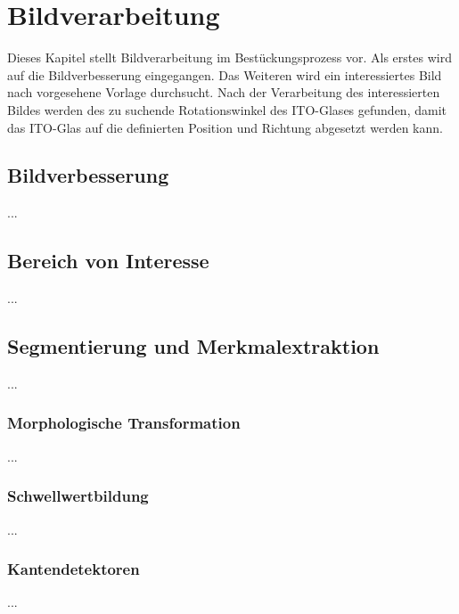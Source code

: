 \chapter{Bildverarbeitung}
Dieses Kapitel stellt Bildverarbeitung im Bestückungsprozess vor. Als erstes wird auf die Bildverbesserung eingegangen. Das Weiteren wird ein interessiertes Bild nach vorgesehene Vorlage durchsucht. Nach der Verarbeitung des interessierten Bildes werden des zu suchende Rotationswinkel des ITO-Glases gefunden, damit das ITO-Glas auf die definierten Position und Richtung abgesetzt werden kann. 
\section{Bildverbesserung}

...

\section{Bereich von Interesse}
...

\section{Segmentierung und Merkmalextraktion}
...

\subsection{Morphologische Transformation}
...

\subsection{Schwellwertbildung}
...

\subsection{Kantendetektoren}
...



